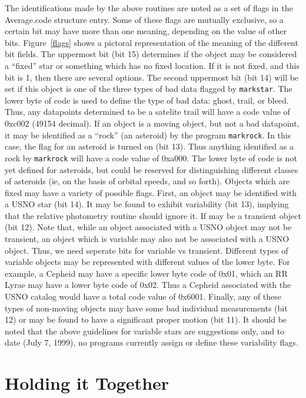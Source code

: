 \documentclass{article}
\begin{document}
The identifications made by the above routines are noted as a set of
flags in the Average.code structure entry.  Some of these flags are
mutually exclusive, so a certain bit may have more than one meaning,
depending on the value of other bits.  Figure~\ref{flags} shows a
pictoral representation of the meaning of the different bit fields.
The uppermost bit (bit 15) determines if the object may be considered
a ``fixed'' star or something which has no fixed location.  If it is
not fixed, and this bit is 1, then there are several options.  The
second uppermost bit (bit 14) will be set if this object is one of the
three types of bad data flagged by {\tt markstar}.  The lower byte of
code is used to define the type of bad data: ghost, trail, or bleed.
Thus, any datapoints determined to be a satelite trail will have a
code value of 0xc002 (49154 decimal).  If an object is a moving
object, but not a bad datapoint, it may be identified as a ``rock''
(an asteroid) by the program {\tt markrock}.  In this case, the flag
for an asteroid is turned on (bit 13).  Thus anything identified as a
rock by {\tt markrock} will have a code value of 0xa000.  The lower
byte of code is not yet defined for asteroids, but could be reserved
for distinguishing different classes of asteroids (ie, on the basis of
orbital speeds, and so forth).  Objects which are fixed may have a
variety of possible flags.  First, an object may be identified with a
USNO star (bit 14).  It may be found to exhibit variability (bit 13),
implying that the relative photometry routine should ignore it.  If
may be a transient object (bit 12).  Note that, while an object
associated with a USNO object may not be transient, an object which is
variable may also not be associated with a USNO object.  Thus, we need
seperate bits for variable vs transient.  Different types of variable
objects may be represented with different values of the lower byte.
For example, a Cepheid may have a specific lower byte code of 0x01,
which an RR Lyrae may have a lower byte code of 0x02.  Thus a Cepheid
associated with the USNO catalog would have a total code value of
0x6001. Finally, any of these types of non-moving objects may have
some bad individual measurements (bit 12) or may be found to have a
significant proper motion (bit 11).  It should be noted that the above
guidelines for variable stars are suggestions only, and to date (July
7, 1999), no programs currently assign or define these variability flags. 

\section{Holding it Together}
\end{document}

